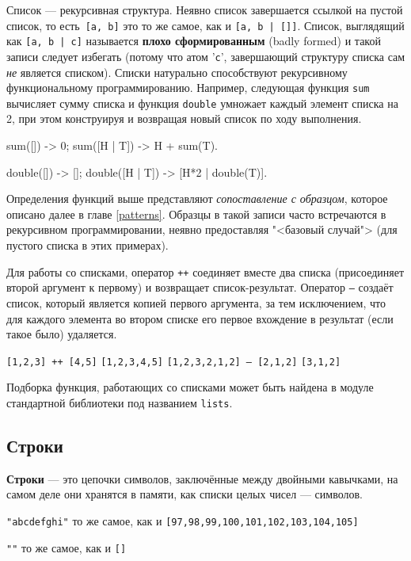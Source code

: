 Список --- рекурсивная структура. Неявно список завершается ссылкой на пустой 
список, то есть~\texttt{[a, b]} это то же самое, как и \texttt{[a, b | []]}. 
Список, выглядящий как \texttt{[a, b | c]} называется \textbf{плохо 
сформированным} (badly formed) и такой записи следует избегать (потому что
атом '\texttt{c}', завершающий структуру списка сам \emph{не} является списком).
Списки натурально способствуют рекурсивному функциональному программированию.
Например, следующая функция \texttt{sum} вычисляет сумму списка и функция 
\texttt{double} умножает каждый элемент списка на 2, при этом конструируя и 
возвращая новый список по ходу выполнения.

\begin{erlang}
sum([]) -> 0;
sum([H | T]) -> H + sum(T).

double([]) -> [];
double([H | T]) -> [H*2 | double(T)].
\end{erlang}

Определения функций выше представляют \emph{сопоставление с образцом}, которое
описано далее в главе \ref{patterns}. Образцы в такой записи часто встречаются в 
рекурсивном программировании, неявно предоставляя "<базовый случай"> (для пустого
списка в этих примерах).

Для работы со списками, оператор \texttt{++} соединяет вместе два списка 
(присоединяет второй аргумент к первому) и возвращает список-результат.  Оператор 
\texttt{--} создаёт список, который является копией первого аргумента, за тем
исключением, что для каждого элемента во втором списке его первое вхождение в
результат (если такое было) удаляется.

\texttt{[1,2,3] ++ [4,5]} \resultingin \texttt{[1,2,3,4,5]}
\texttt{[1,2,3,2,1,2] -- [2,1,2]} \resultingin \texttt{[3,1,2]}

Подборка функция, работающих со списками может быть найдена в модуле стандартной
библиотеки под названием \texttt{lists}.


\subsection{Строки}
\label{datatypes:string}

\textbf{Строки} --- это цепочки символов, заключённые между двойными кавычками,
на самом деле они хранятся в памяти, как списки целых чисел --- символов.

\texttt{"abcdefghi"} то же самое, как и \texttt{[97,98,99,100,101,102,103,104,105]}

\texttt{""} то же самое, как и \texttt{[]}


